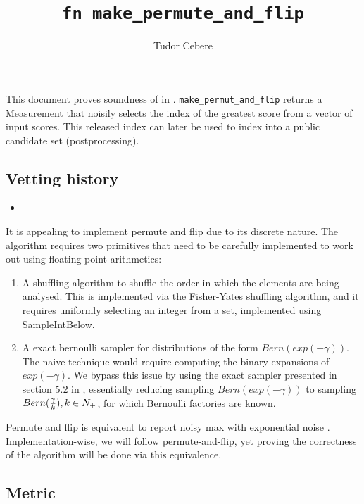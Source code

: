 \documentclass{article} %
\title{\texttt{fn make\_permute\_and\_flip}}
\author{Tudor Cebere}\date{}
\begin{document}
\maketitle\contrib
This document proves soundness of  \cite{mckenna2020permute} in . \texttt{make\_permut\_and\_flip} returns a Measurement that noisily selects the index of the greatest score from a vector of input scores. This released index can later be used to index into a public candidate set (postprocessing).

\subsection*{Vetting history}
\begin{itemize}
    \item {}
\end{itemize}

It is appealing to implement permute and flip due to its discrete nature.
The algorithm requires two primitives that need to be carefully implemented to work out using floating point arithmetics:
\begin{enumerate}
    \item A shuffling algorithm to shuffle the order in which the elements are being analysed. This is implemented via the Fisher-Yates shuffling algorithm, and it requires uniformly selecting an integer from a set, implemented using SampleIntBelow.
    \item A exact bernoulli sampler for distributions of the form $Bern(exp(-\gamma))$. The naive technique would require computing the binary expansions of $exp(-\gamma)$. We bypass this issue by using the exact sampler presented in section 5.2 in \cite{canonne2020discrete}, essentially reducing sampling $Bern(exp(-\gamma))$ to sampling $Bern(\frac{\gamma}{k}), \\ k \in N_{+}$, for which Bernoulli factories are known.
\end{enumerate}

Permute and flip is equivalent to report noisy max with exponential noise \cite{ding2021permute}. Implementation-wise, we will follow permute-and-flip, yet proving the correctness of the algorithm will be done via this equivalence.
\subsection*{Metric}
\end{document}
